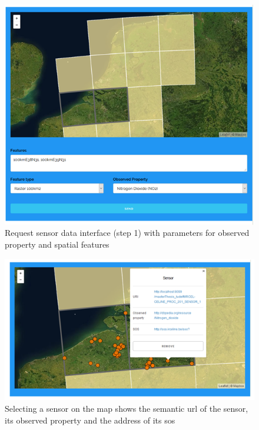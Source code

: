 \begin{figure}
	\centering
	\includegraphics[width=\linewidth]{figs/interface1.PNG}
	\caption{Request sensor data interface (step 1) with parameters for observed property and spatial features}
	\label{fig:interface1}
\end{figure}

\begin{figure}
	\centering
	\includegraphics[width=\linewidth]{figs/interface3.PNG}
	\caption{Selecting a sensor on the map shows the semantic \ac{url} of the sensor, its observed property and the address of its \ac{sos}}
	\label{fig:interface2}
\end{figure}

